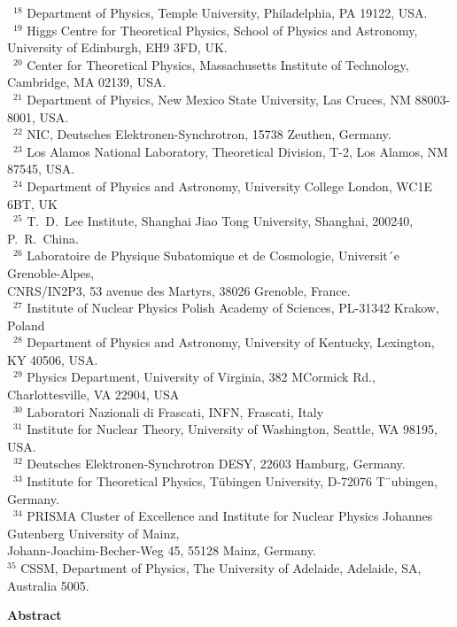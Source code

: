 \documentclass[twoside,12pt]{article}
\numberwithin{equation}{section}
\numberwithin{figure}{section}
\numberwithin{table}{section}
\begin{document}
\begin{center}
{~$^{18}$ Department of Physics, Temple University, Philadelphia, PA 19122, USA. \\
~$^{19}$ Higgs Centre for Theoretical Physics, School of
Physics and Astronomy,\\ University of Edinburgh, EH9 3FD, UK. \\
~$^{20}$ Center for Theoretical Physics, Massachusetts Institute of Technology, Cambridge, MA 02139, USA. \\
~$^{21}$ Department of Physics, New Mexico State University, Las Cruces, NM 88003-8001, USA. \\
~$^{22}$ NIC, Deutsches Elektronen-Synchrotron, 15738 Zeuthen, Germany.\\
~$^{23}$ Los Alamos National Laboratory, Theoretical Division, T-2, Los Alamos, NM 87545, USA. \\
~$^{24}$ Department of Physics and Astronomy, University College London, WC1E 6BT, UK \\
~$^{25}$ T.~D.~Lee Institute, Shanghai Jiao Tong University, Shanghai, 200240, P.~R.~China. \\
~$^{26}$ Laboratoire de Physique Subatomique et de Cosmologie, Universit´e Grenoble-Alpes,\\ 
  CNRS/IN2P3, 53 avenue des Martyrs,  38026 Grenoble, France. \\
~$^{27}$ Institute of Nuclear Physics Polish Academy of Sciences, PL-31342 Krakow, Poland \\
~$^{28}$ Department of Physics and Astronomy, University of Kentucky, 
Lexington, KY 40506, USA. \\
~$^{29}$ Physics Department, University of Virginia, 382 MCormick Rd.,
Charlottesville, VA 22904, USA \\
~$^{30}$ Laboratori Nazionali di Frascati, INFN, Frascati, Italy \\
~$^{31}$ Institute for Nuclear Theory, University of Washington, Seattle, WA 98195, USA. \\
~$^{32}$ Deutsches Elektronen-Synchrotron DESY, 22603 Hamburg, Germany. \\
~$^{33}$ Institute for Theoretical Physics, T\"ubingen University, D-72076 T¨ubingen, Germany. \\
~$^{34}$ PRISMA Cluster of Excellence and Institute for Nuclear Physics 
Johannes Gutenberg University of Mainz, \\ Johann-Joachim-Becher-Weg 45, 55128 Mainz, Germany. \\
$^{35}$ CSSM, Department of Physics, The University of Adelaide, Adelaide, SA, Australia 5005.\\
}

\clearpage

{\bf \large Abstract}


\end{center}
\end{document}
